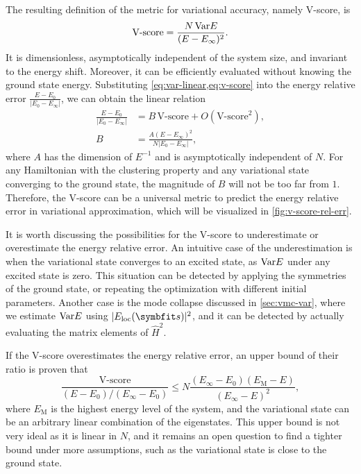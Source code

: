 The resulting definition of the metric for variational accuracy, namely V-score, is
\begin{equation}
\text{V-score} = \frac{N\,\mathrm{Var} E}{(E - E_\infty)^2}.
\label{eq:v-score}
\end{equation}
It is dimensionless, asymptotically independent of the system size, and invariant to the energy shift. Moreover, it can be efficiently evaluated without knowing the ground state energy. Substituting \cref{eq:var-linear,eq:v-score} into the energy relative error $\frac{E - E_0}{|E_0 - E_\infty|}$, we can obtain the linear relation
\begin{align}
\frac{E - E_0}{|E_0 - E_\infty|} &= B\,\text{V-score} + O(\text{V-score}^2), \label{eq:v-score-rel-err} \\
B &= \frac{A (E - E_\infty)^2}{N |E_0 - E_\infty|},
\end{align}
where $A$ has the dimension of $E^{-1}$ and is asymptotically independent of $N$. For any Hamiltonian with the clustering property and any variational state converging to the ground state, the magnitude of $B$ will not be too far from $1$. Therefore, the V-score can be a universal metric to predict the energy relative error in variational approximation, which will be visualized in \cref{fig:v-score-rel-err}.

It is worth discussing the possibilities for the V-score to underestimate or overestimate the energy relative error. An intuitive case of the underestimation is when the variational state converges to an excited state, as $\mathrm{Var} E$ under any excited state is zero. This situation can be detected by applying the symmetries of the ground state, or repeating the optimization with different initial parameters. Another case is the mode collapse discussed in \cref{sec:vmc-var}, where we estimate $\mathrm{Var} E$ using $|E_\text{loc}(\vs)|^2$, and it can be detected by actually evaluating the matrix elements of $\hat{H}^2$.

If the V-score overestimates the energy relative error, an upper bound of their ratio is proven that
\begin{equation}
\frac{\text{V-score}}{(E - E_0) / (E_\infty - E_0)} \le N \frac{(E_\infty - E_0) (E_\text{M} - E)}{(E_\infty - E)^2},
\label{eq:v-score-bound}
\end{equation}
where $E_\text{M}$ is the highest energy level of the system, and the variational state can be an arbitrary linear combination of the eigenstates. This upper bound is not very ideal as it is linear in $N$, and it remains an open question to find a tighter bound under more assumptions, such as the variational state is close to the ground state.

